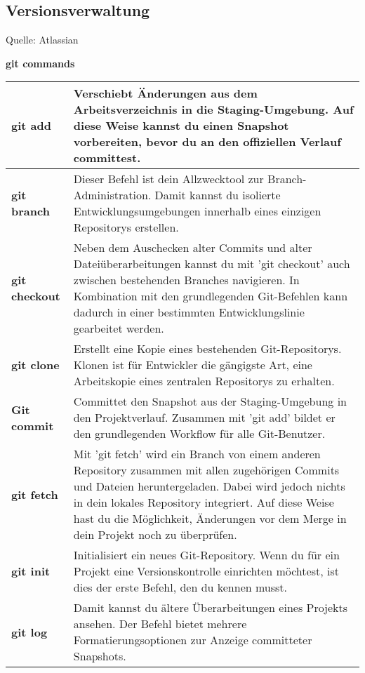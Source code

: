 \clearpage

\subsection{Versionsverwaltung}
\label{sec:Versionsverwaltung} 

Quelle: Atlassian \cite{gitCommands}

\textbf{git commands}

\begin{center}
	\setlength\arrayrulewidth{1pt}
	\begin{tabular}{|p{} | p{}|}
		\hline
		\textbf{git add} & Verschiebt Änderungen aus dem Arbeitsverzeichnis in die Staging-Umgebung. Auf diese Weise kannst du einen Snapshot vorbereiten, bevor du an den offiziellen Verlauf committest.\\
		\hline
		\textbf{git branch} & Dieser Befehl ist dein Allzwecktool zur Branch-Administration. Damit kannst du isolierte Entwicklungsumgebungen innerhalb eines einzigen Repositorys erstellen.\\
		\hline
		\textbf{git checkout} & Neben dem Auschecken alter Commits und alter Dateiüberarbeitungen kannst du mit 'git checkout' auch zwischen bestehenden Branches navigieren. In Kombination mit den grundlegenden Git-Befehlen kann dadurch in einer bestimmten Entwicklungslinie gearbeitet werden.\\
		\hline
		\textbf{git clone} & Erstellt eine Kopie eines bestehenden Git-Repositorys. Klonen ist für Entwickler die gängigste Art, eine Arbeitskopie eines zentralen Repositorys zu erhalten.\\
		\hline
		\textbf{Git commit} & Committet den Snapshot aus der Staging-Umgebung in den Projektverlauf. Zusammen mit 'git add' bildet er den grundlegenden Workflow für alle Git-Benutzer.\\
		\hline
		\textbf{git fetch} & Mit 'git fetch' wird ein Branch von einem anderen Repository zusammen mit allen zugehörigen Commits und Dateien heruntergeladen. Dabei wird jedoch nichts in dein lokales Repository integriert. Auf diese Weise hast du die Möglichkeit, Änderungen vor dem Merge in dein Projekt noch zu überprüfen.\\
		\hline
		\textbf{git init} & Initialisiert ein neues Git-Repository. Wenn du für ein Projekt eine Versionskontrolle einrichten möchtest, ist dies der erste Befehl, den du kennen musst.\\
		\hline
		\textbf{git log} & Damit kannst du ältere Überarbeitungen eines Projekts ansehen. Der Befehl bietet mehrere Formatierungsoptionen zur Anzeige committeter Snapshots.\\

\end{tabular}
\end{center}

